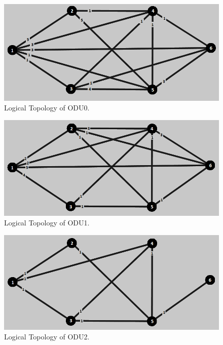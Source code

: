 \begin{figure}[H]
\centering
\includegraphics[width=13cm]{sdf/heuristic/figures/topologies/opaque_surv/low/logical_topology_odu0_low}
\caption{Logical Topology of ODU0.}
\label{logical_ODU0_surv_ref_low_heuristic}
\end{figure}

\begin{figure}[H]
\centering
\includegraphics[width=13cm]{sdf/heuristic/figures/topologies/opaque_surv/low/logical_topology_odu1_low}
\caption{Logical Topology of ODU1.}
\label{logical_ODU1_surv_ref_low_heuristic}
\end{figure}

\begin{figure}[H]
\centering
\includegraphics[width=13cm]{sdf/heuristic/figures/topologies/opaque_surv/low/logical_topology_odu2_low}
\caption{Logical Topology of ODU2.}
\label{logical_ODU2_surv_ref_low_heuristic}
\end{figure}

